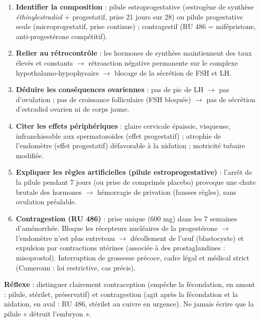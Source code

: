 \documentclass[11pt]{article}
\newcommand{\cle}[1]{{\popxbold\color{popdark}#1}}
\begin{document}
\begin{methode}
\begin{enumerate}
\item \textbf{Identifier la composition} : pilule \cle{estroprogestative} (œstrogène de synthèse \emph{éthinylestradiol} + progestatif, prise 21 jours sur 28) ou pilule \cle{progestative} seule (microprogestatif, prise continue) ; contragestif (RU 486 = \cle{mifépristone}, anti-progestérone compétitif).
\item \textbf{Relier au rétrocontrôle} : les hormones de synthèse maintiennent des taux élevés et constants $\rightarrow$ rétroaction négative permanente sur le complexe hypothalamo-hypophysaire $\rightarrow$ blocage de la sécrétion de FSH et LH.
\item \textbf{Déduire les conséquences ovariennes} : pas de pic de LH $\rightarrow$ pas d'ovulation ; pas de croissance folliculaire (FSH bloquée) $\rightarrow$ pas de sécrétion d'estradiol ovarien ni de corps jaune.
\item \textbf{Citer les effets périphériques} : glaire cervicale épaissie, visqueuse, infranchissable aux spermatozoïdes (effet progestatif) ; atrophie de l'endomètre (effet progestatif) défavorable à la nidation ; motricité tubaire modifiée.
\item \textbf{Expliquer les règles artificielles (pilule estroprogestative)} : l'arrêt de la pilule pendant 7 jours (ou prise de comprimés placebo) provoque une chute brutale des hormones $\rightarrow$ hémorragie de privation (fausses règles), sans ovulation préalable.
\item \textbf{Contragestion (RU 486)} : prise unique (600 mg) dans les 7 semaines d'aménorrhée. Bloque les récepteurs nucléaires de la progestérone $\rightarrow$ l'endomètre n'est plus entretenu $\rightarrow$ décollement de l'œuf (blastocyste) et expulsion par contractions utérines (associée à des prostaglandines : misoprostol). Interruption de grossesse précoce, cadre légal et médical strict (Cameroun : loi restrictive, cas précis).
\end{enumerate}
\textbf{Réflexe} : distinguer clairement \cle{contraception} (empêche la fécondation, en amont : pilule, stérilet, préservatif) et \cle{contragestion} (agit après la fécondation et la nidation, en aval : RU 486, stérilet au cuivre en urgence). Ne jamais écrire que la pilule « détruit l'embryon ».
\end{methode}
\end{document}
